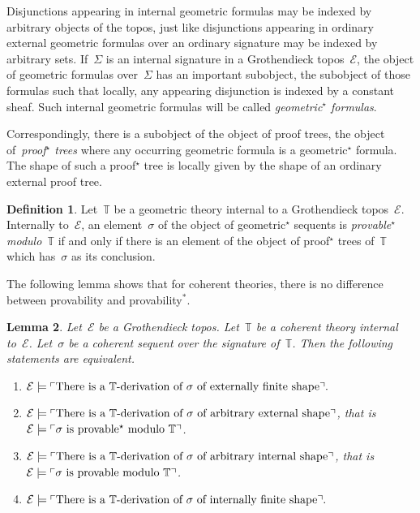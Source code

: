 \documentclass[oneside,reqno]{amsart}
\theoremstyle{definition}
\newtheorem{defn}{Definition}[section]
\theoremstyle{plain}
\newtheorem{lemma}[defn]{Lemma}
\theoremstyle{remark}
\newcommand{\E}{\mathcal{E}}
\newcommand{\TT}{\mathbb{T}}
\renewcommand{\_}{\mathpunct{.}\,}
\newcommand{\?}{\,{:}\,}
\newcommand{\speak}[1]{\ulcorner\text{\textnormal{#1}}\urcorner}
\begin{document}
Disjunctions appearing in internal geometric formulas may be indexed by
arbitrary objects of the topos, just like disjunctions appearing in ordinary
external geometric formulas over an ordinary signature may be indexed by
arbitrary sets. If~$\Sigma$ is an internal signature in a Grothendieck topos~$\E$, the object of geometric
formulas over~$\Sigma$ has an important
subobject, the subobject of those formulas such that locally, any appearing
disjunction is indexed by a constant sheaf. Such internal geometric formulas
will be called \emph{geometric$^\star$ formulas}.

Correspondingly, there is a subobject of the object of proof trees, the object
of~\emph{proof$^\star$ trees} where any occurring geometric formula is a
geometric$^\star$ formula. The shape of such a proof$^\star$ tree is locally
given by the shape of an ordinary external proof tree.

\begin{defn}\label{defn:provability*}
Let~$\TT$ be a geometric theory internal to a Grothendieck topos~$\E$.
Internally to~$\E$, an element~$\sigma$ of the object of geometric$^\star$
sequents is \emph{provable$^\star$ modulo~$\TT$} if and only if there is an
element of the object of proof$^\star$ trees of~$\TT$ which has~$\sigma$ as its
conclusion.\end{defn}

The following lemma shows that for coherent theories, there is no difference
between provability and provability$^*$.

\begin{lemma}\label{lemma:provability-in-coherent-case}
Let~$\E$ be a Grothendieck topos. Let~$\TT$ be a coherent theory
internal to~$\E$. Let~$\sigma$ be a coherent sequent over the signature
of~$\TT$. Then the following statements are equivalent.
\begin{enumerate}
\item $\E \models \speak{There is a~$\TT$-derivation of~$\sigma$ of externally
finite shape}.$ \smallskip
\item $\E \models \speak{There is a~$\TT$-derivation of~$\sigma$ of arbitrary
external shape}$, that is~$\E \models \speak{$\sigma$ is provable$^\star$
modulo~$\TT$}$. \smallskip
\item $\E \models \speak{There is a~$\TT$-derivation of~$\sigma$ of arbitrary
internal shape}$, that is~$\E \models \speak{$\sigma$ is provable
modulo~$\TT$}$. \smallskip
\item $\E \models \speak{There is a~$\TT$-derivation of~$\sigma$ of internally
finite shape}.$
\end{enumerate}
\end{lemma}
\end{document}
